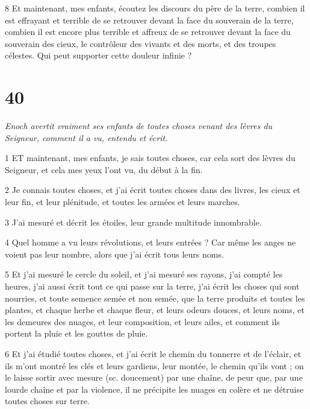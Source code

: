 \par 8 Et maintenant, mes enfants, écoutez les discours du père de la terre, combien il est effrayant et terrible de se retrouver devant la face du souverain de la terre, combien il est encore plus terrible et affreux de se retrouver devant la face du souverain des cieux, le contrôleur des vivants et des morts, et des troupes célestes. Qui peut supporter cette douleur infinie ?

\chapter{40}

\par \textit{Enoch avertit vraiment ses enfants de toutes choses venant des lèvres du Seigneur, comment il a vu, entendu et écrit.}

\par 1 ET maintenant, mes enfants, je sais toutes choses, car cela sort des lèvres du Seigneur, et cela mes yeux l'ont vu, du début à la fin.

\par 2 Je connais toutes choses, et j'ai écrit toutes choses dans des livres, les cieux et leur fin, et leur plénitude, et toutes les armées et leurs marches.

\par 3 J'ai mesuré et décrit les étoiles, leur grande multitude innombrable.

\par 4 Quel homme a vu leurs révolutions, et leurs entrées ? Car même les anges ne voient pas leur nombre, alors que j'ai écrit tous leurs noms.

\par 5 Et j'ai mesuré le cercle du soleil, et j'ai mesuré ses rayons, j'ai compté les heures, j'ai aussi écrit tout ce qui passe sur la terre, j'ai écrit les choses qui sont nourries, et toute semence semée et non semée, que la terre produits et toutes les plantes, et chaque herbe et chaque fleur, et leurs odeurs douces, et leurs noms, et les demeures des nuages, et leur composition, et leurs ailes, et comment ils portent la pluie et les gouttes de pluie.

\par 6 Et j'ai étudié toutes choses, et j'ai écrit le chemin du tonnerre et de l'éclair, et ils m'ont montré les clés et leurs gardiens, leur montée, le chemin qu'ils vont ; on le laisse sortir avec mesure (sc. doucement) par une chaîne, de peur que, par une lourde chaîne et par la violence, il ne précipite les nuages ​​​​en colère et ne détruise toutes choses sur terre.

